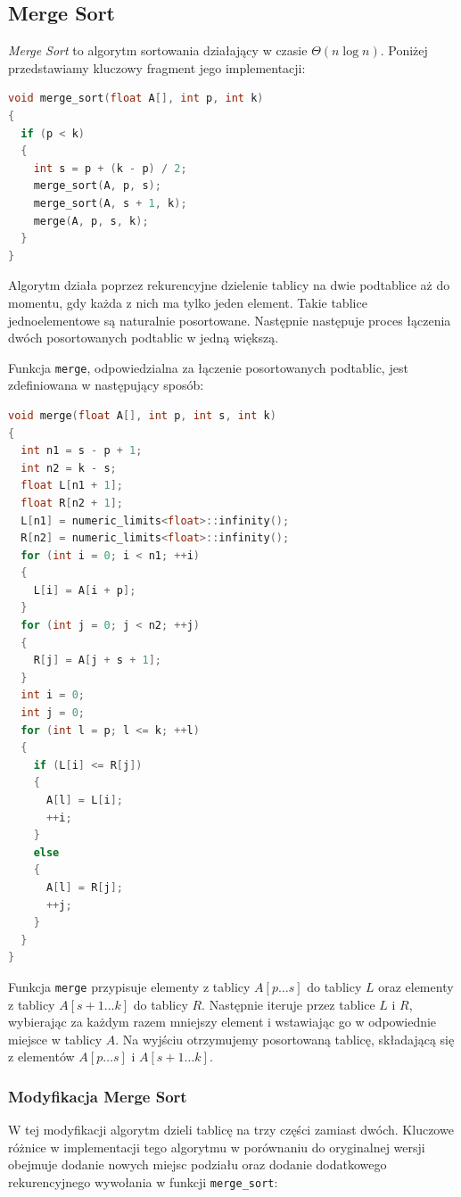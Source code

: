 \documentclass{article}
\begin{document}
\subsection{Merge Sort}
\textit{Merge Sort} to algorytm sortowania działający w czasie \( \Theta(n \log n) \). Poniżej przedstawiamy kluczowy fragment jego implementacji:
\begin{lstlisting}[style=mystyle, language=C++, caption={Implementacja Merge Sort}, label={lst:mergesort}]
void merge_sort(float A[], int p, int k)
{
  if (p < k)
  {
    int s = p + (k - p) / 2;
    merge_sort(A, p, s);
    merge_sort(A, s + 1, k);
    merge(A, p, s, k);
  }
}
\end{lstlisting}
Algorytm działa poprzez rekurencyjne dzielenie tablicy na dwie podtablice aż do momentu, gdy każda z nich ma tylko jeden element. Takie tablice jednoelementowe są naturalnie posortowane. Następnie następuje proces łączenia dwóch posortowanych podtablic w jedną większą.

Funkcja \texttt{merge}, odpowiedzialna za łączenie posortowanych podtablic, jest zdefiniowana w następujący sposób:

\newpage
 
\begin{lstlisting}[style=mystyle, language=C++, caption={Implementacja Merge}, label={lst:merge}]
void merge(float A[], int p, int s, int k)
{
  int n1 = s - p + 1;
  int n2 = k - s;
  float L[n1 + 1];
  float R[n2 + 1];
  L[n1] = numeric_limits<float>::infinity();
  R[n2] = numeric_limits<float>::infinity();
  for (int i = 0; i < n1; ++i)
  {
    L[i] = A[i + p];
  }
  for (int j = 0; j < n2; ++j)
  {
    R[j] = A[j + s + 1];
  }
  int i = 0;
  int j = 0;
  for (int l = p; l <= k; ++l)
  {
    if (L[i] <= R[j])
    {
      A[l] = L[i];
      ++i;
    }
    else
    {
      A[l] = R[j];
      ++j;
    }
  }
} 
\end{lstlisting}
Funkcja \texttt{merge} przypisuje elementy z tablicy \( A[p \ldots s] \) do tablicy \( L \) oraz elementy z tablicy \( A[s+1 \ldots k] \) do tablicy \( R \). Następnie iteruje przez tablice \( L \) i \( R \), wybierając za każdym razem mniejszy element i wstawiając go w odpowiednie miejsce w tablicy \( A \). Na wyjściu otrzymujemy posortowaną tablicę, składającą się z elementów \( A[p \ldots s] \) i \( A[s+1 \ldots k] \).
\subsubsection{Modyfikacja Merge Sort}
W tej modyfikacji algorytm dzieli tablicę na trzy części zamiast dwóch. Kluczowe różnice w implementacji tego algorytmu w porównaniu do oryginalnej wersji obejmuje dodanie nowych miejsc podziału oraz dodanie dodatkowego rekurencyjnego wywołania w funkcji \texttt{merge\_sort}:
\end{document}

